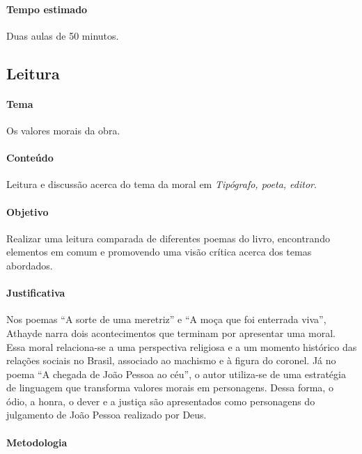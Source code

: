 \documentclass[12pt]{extarticle}
\begin{document}
\paragraph{Tempo estimado} Duas aulas de 50 minutos.



\subsection{Leitura}



\paragraph{Tema} Os valores morais da obra.

\paragraph{Conteúdo} Leitura e discussão acerca do tema da moral em \emph{Tipógrafo, poeta, editor}.

\paragraph{Objetivo} Realizar uma leitura comparada de diferentes poemas do livro, encontrando elementos em comum e promovendo uma visão crítica acerca dos temas abordados.

\paragraph{Justificativa} Nos poemas ``A sorte de uma meretriz'' e ``A moça que
foi enterrada viva'', Athayde narra dois acontecimentos
que terminam por apresentar uma moral. Essa
moral relaciona-se a uma perspectiva religiosa e a
um momento histórico das relações sociais no Brasil,
associado ao machismo e à figura do coronel. Já no poema ``A chegada de João Pessoa ao céu'', o autor
utiliza-se de uma estratégia de linguagem que transforma
valores morais em personagens. Dessa forma,
o ódio, a honra, o dever e a justiça são apresentados
como personagens do julgamento de João Pessoa realizado
por Deus. 

\paragraph{Metodologia}
\end{document}
